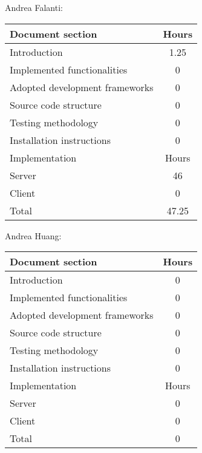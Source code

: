 Andrea Falanti:

\begin{tabular}{|l|c|}
    \hline
    Document section & Hours\\
    \hline
     Introduction & 1.25\\
     Implemented functionalities & 0\\
     Adopted development frameworks & 0\\
     Source code structure & 0\\
     Testing methodology & 0\\
     Installation instructions & 0\\
     \hline
     Implementation & Hours \\
     \hline
     Server & 46\\
     Client & 0\\
     \hline
     Total & 47.25\\
     \hline
\end{tabular}

\vskip 0.3in

Andrea Huang:

\begin{tabular}{|l|c|}
    \hline
    Document section & Hours \\
    \hline
     Introduction & 0\\
     Implemented functionalities & 0\\
     Adopted development frameworks & 0\\
     Source code structure & 0\\
     Testing methodology & 0\\
     Installation instructions & 0\\
     \hline
     Implementation & Hours \\
     \hline
     Server & 0\\
     Client & 0\\
     \hline
     Total & 0\\
     \hline
\end{tabular}